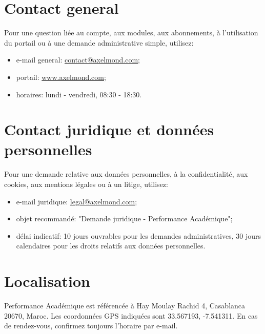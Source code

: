 \documentclass[11pt,a4paper]{article}
\begin{document}
\PAMakeCover
{}

\hfill
{}

\hfill
{}

\section{Contact general}
Pour une question liée au compte, aux modules, aux abonnements, à l'utilisation du portail ou à une demande administrative simple, utilisez:
\begin{itemize}
  \item e-mail general: \href{mailto:contact@axelmond.com}{contact@axelmond.com};
  \item portail: \href{https://axelmond.com}{www.axelmond.com};
  \item horaires: lundi - vendredi, 08:30 - 18:30.
\end{itemize}

\section{Contact juridique et données personnelles}
Pour une demande relative aux données personnelles, à la confidentialité, aux cookies, aux mentions légales ou à un litige, utilisez:
\begin{itemize}
  \item e-mail juridique: \href{mailto:legal@axelmond.com}{legal@axelmond.com};
  \item objet recommandé: "Demande juridique - Performance Académique";
  \item délai indicatif: 10 jours ouvrables pour les demandes administratives, 30 jours calendaires pour les droits relatifs aux données personnelles.
\end{itemize}

\section{Localisation}
Performance Académique est référencée à Hay Moulay Rachid 4, Casablanca 20670, Maroc. Les coordonnées GPS indiquées sont 33.567193, -7.541311. En cas de rendez-vous, confirmez toujours l'horaire par e-mail.
\end{document}
